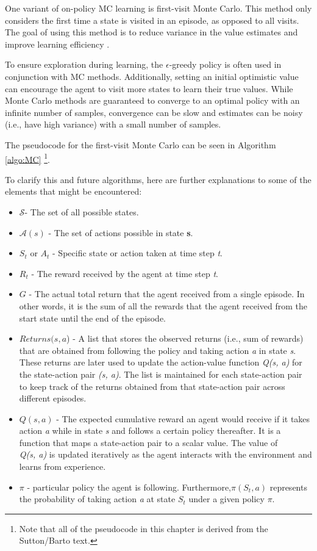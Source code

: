 One variant of on-policy MC learning is first-visit Monte Carlo. This method only considers the first time a state is visited in an episode, as opposed to all visits. The goal of using this method is to reduce variance in the value estimates and improve learning efficiency  \citep{RLSuttonBarto}. 

To ensure exploration during learning, the $\epsilon$-greedy policy is often used in conjunction with MC methods. Additionally, setting an initial optimistic value can encourage the agent to visit more states to learn their true values. While Monte Carlo methods are guaranteed to converge to an optimal policy with an infinite number of samples, convergence can be slow and estimates can be noisy (i.e., have high variance) with a small number of samples.

The pseudocode for the first-visit Monte Carlo can be seen in Algorithm \ref{algo:MC}  \citep{RLSuttonBarto}\footnote{Note that all of the pseudocode in this chapter is derived from the Sutton/Barto text.}.

To clarify this and future algorithms, here are further explanations to some of the elements that might be encountered:
\begin{itemize}
\item $\mathcal{S}$- The set of all possible states.
\item $\mathcal{A}(s)$ - The set of actions possible in state \textbf{s}.
\item $S_t$ or $A_t$ - Specific state or action taken at time step \textit{t}.
\item $R_{t}$ -  The reward received by the agent at time step \textit{t}.
\item $G$ - The actual total return that the agent received from a single episode. In other words, it is the sum of all the rewards that the agent received from the start state until the end of the episode.
\item $Returns(s, a$) - A list that stores the observed returns (i.e., sum of rewards) that are obtained from following the policy and taking action \textit{a} in state \textit{s}. These returns are later used to update the action-value function \textit{Q(s, a)} for the state-action pair \textit{(s, a)}. The list is maintained for each state-action pair to keep track of the returns obtained from that state-action pair across different episodes.
\item $Q(s, a)$ -  The expected cumulative reward an agent would receive if it takes action \textit{a} while in state \textit{s} and follows a certain policy thereafter. It is a function that maps a state-action pair to a scalar value. The value of \\ \textit{Q(s, a)} is updated iteratively as the agent interacts with the environment and learns from experience.
\item  $\pi$ - particular policy the agent is following. Furthermore,\textit{$\pi(S_t,a)$} represents the probability of taking action \textit{a} at state \textit{$S_t$} under a given policy \textit{$\pi$}.
\end{itemize}


